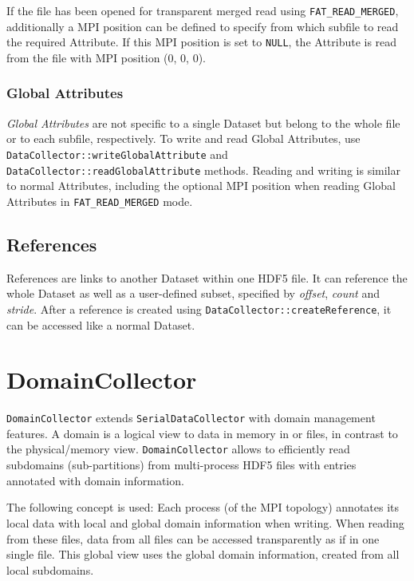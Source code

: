 \documentclass[a4paper,10pt,BCOR12mm]{report}
\newcommand{\code}[1]{\small \texttt{#1}}
\begin{document}
If the file has been opened for transparent merged read using \code{FAT\_READ\_MERGED},
additionally a MPI position can be defined to specify from which subfile to read
the required Attribute.
If this MPI position is set to \code{NULL}, the Attribute is read from the file with
MPI position (0, 0, 0).

\subsection{Global Attributes}

\emph{Global Attributes} are not specific to a single Dataset but belong to the whole
file or to each subfile, respectively.
To write and read Global Attributes, use\\ \code{DataCollector::writeGlobalAttribute} and\\
\code{DataCollector::readGlobalAttribute} methods.
Reading and writing is similar to normal Attributes, including the optional MPI position
when reading Global Attributes in \code{FAT\_READ\_MERGED} mode.


\section{References}

References are links to another Dataset within one HDF5 file.
It can reference the whole Dataset as well as a user-defined subset, specified
by \emph{offset}, \emph{count} and \emph{stride}.
After a reference is created using \code{DataCollector::createReference},
it can be accessed like a normal Dataset.


\chapter{DomainCollector}

\code{DomainCollector} extends \code{SerialDataCollector} with domain management features.
A domain is a logical view to data in memory in or files, in contrast to the physical/memory view.
\code{DomainCollector} allows to efficiently read subdomains (sub-partitions) from multi-process
HDF5 files with entries annotated with domain information.

The following concept is used: Each process (of the MPI topology)
annotates its local data with local and global domain information when writing.
When reading from these files, data from all files can be accessed transparently as if in one single file.
This global view uses the global domain information, created from all local subdomains.
\end{document}
